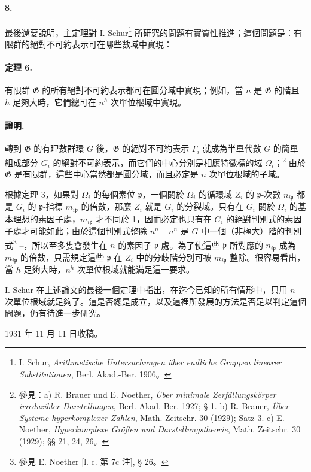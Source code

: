 \documentclass[11pt]{article}
\begin{document}
\paragraph{8.}
最後還要說明，主定理對 I. Schur\footnote{I. Schur, \emph{Arithmetische Untersuchungen über endliche Gruppen linearer Substitutionen}, Berl. Akad.-Ber. 1906。} 所研究的問題有實質性推進；這個問題是：有限群的絕對不可約表示可在哪些數域中實現：

\paragraph{定理 6.}
有限群 \(\mathfrak G\) 的所有絕對不可約表示都可在圓分域中實現；例如，當 \(n\) 是 \(\mathfrak G\) 的階且 \(h\) 足夠大時，它們總可在 \(n^h\) 次單位根域中實現。

\paragraph{證明.}
轉到 \(\mathfrak G\) 的有理數群環 \(G\) 後，\(\mathfrak G\) 的絕對不可約表示 \(\Gamma_i\) 就成為半單代數 \(G\) 的簡單組成部分 \(G_i\) 的絕對不可約表示，而它們的中心分別是相應特徵標的域 \(\Omega_i\)；\footnote{參見：a) R. Brauer und E. Noether, \emph{Über minimale Zerfällungskörper irreduzibler Darstellungen}, Berl. Akad.-Ber. 1927; § 1. b) R. Brauer, \emph{Über Systeme hyperkomplexer Zahlen}, Math. Zeitschr. 30 (1929); Satz 3. c) E. Noether, \emph{Hyperkomplexe Größen und Darstellungstheorie}, Math. Zeitschr. 30 (1929); §§ 21, 24, 26。} 由於 \(\mathfrak G\) 是有限群，這些中心當然都是圓分域，而且必定是 \(n\) 次單位根域的子域。

根據定理 3，如果對 \(\Omega_i\) 的每個素位 \(\mathfrak p\)，一個關於 \(\Omega_i\) 的循環域 \(Z_i\) 的 \(\mathfrak p\)-次數 \(n_{i\mathfrak p}\) 都是 \(G_i\) 的 \(\mathfrak p\)-指標 \(m_{i\mathfrak p}\) 的倍數，那麼 \(Z_i\) 就是 \(G_i\) 的分裂域。只有在 \(G_i\) 關於 \(\Omega_i\) 的基本理想的素因子處，\(m_{i\mathfrak p}\) 才不同於 1，因而必定也只有在 \(G_i\) 的絕對判別式的素因子處才可能如此；由於這個判別式整除 \(n^n\) -- \(n^n\) 是 \(G\) 中一個（非極大）階的判別式\footnote{參見 E. Noether [l. c. 第 7c 注], § 26。} --，所以至多隻會發生在 \(n\) 的素因子 \(\mathfrak p\) 處。為了使這些 \(\mathfrak p\) 所對應的 \(n_{i\mathfrak p}\) 成為 \(m_{i\mathfrak p}\) 的倍數，只需規定這些 \(\mathfrak p\) 在 \(Z_i\) 中的分歧階分別可被 \(m_{i\mathfrak p}\) 整除。很容易看出，當 \(h\) 足夠大時，\(n^h\) 次單位根域就能滿足這一要求。

I. Schur 在上述論文的最後一個定理中指出，在迄今已知的所有情形中，只用 \(n\) 次單位根域就足夠了。這是否總是成立，以及這裡所發展的方法是否足以判定這個問題，仍有待進一步研究。

\begin{center}
1931 年 11 月 11 日收稿。
\end{center}

\clearpage

\setcounter{footnote}{0}
\end{document}
